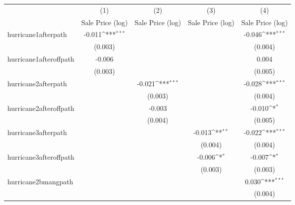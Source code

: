 {
\def\sym#1{\ifmmode^{#1}\else\(^{#1}\)\fi}
\begin{tabular}{l*{4}{c}}
\hline\hline
                    &\multicolumn{1}{c}{(1)}&\multicolumn{1}{c}{(2)}&\multicolumn{1}{c}{(3)}&\multicolumn{1}{c}{(4)}\\
                    &\multicolumn{1}{c}{Sale Price (log)}&\multicolumn{1}{c}{Sale Price (log)}&\multicolumn{1}{c}{Sale Price (log)}&\multicolumn{1}{c}{Sale Price (log)}\\
\hline
hurricane1afterpath &      -0.011\sym{***}&                     &                     &      -0.046\sym{***}\\
                    &     (0.003)         &                     &                     &     (0.004)         \\
[1em]
hurricane1afteroffpath&      -0.006         &                     &                     &       0.004         \\
                    &     (0.003)         &                     &                     &     (0.005)         \\
[1em]
hurricane2afterpath &                     &      -0.021\sym{***}&                     &      -0.028\sym{***}\\
                    &                     &     (0.003)         &                     &     (0.004)         \\
[1em]
hurricane2afteroffpath&                     &      -0.003         &                     &      -0.010\sym{*}  \\
                    &                     &     (0.004)         &                     &     (0.005)         \\
[1em]
hurricane3afterpath &                     &                     &      -0.013\sym{**} &      -0.022\sym{***}\\
                    &                     &                     &     (0.004)         &     (0.004)         \\
[1em]
hurricane3afteroffpath&                     &                     &      -0.006\sym{*}  &      -0.007\sym{*}  \\
                    &                     &                     &     (0.003)         &     (0.003)         \\
[1em]
hurricane2bmangpath &                     &                     &                     &       0.030\sym{***}\\
                    &                     &                     &                     &     (0.004)         \\

\end{tabular}}
